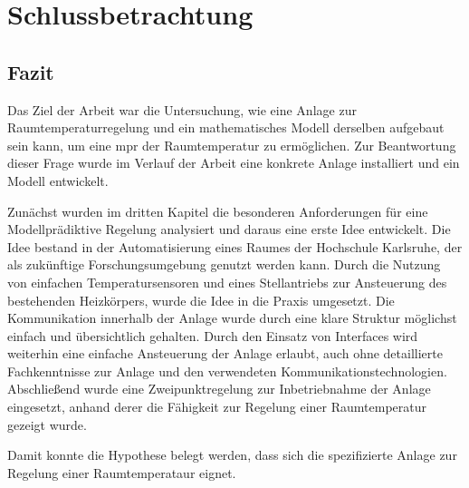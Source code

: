 %
%

\renewcommand{\chapterheadstartvskip}{\vspace*{3cm}}

\chapter{Schlussbetrachtung}
\label{chap:schlussteil}
\renewcommand{\chapterheadstartvskip}{\vspace*{-0.5cm}}

\section{Fazit}
\label{sec:zusammenfassung}

Das Ziel der Arbeit war die Untersuchung, wie eine Anlage zur Raumtemperaturregelung und ein mathematisches Modell derselben aufgebaut sein kann, um eine \acrlong{mpr} der Raumtemperatur zu ermöglichen.
Zur Beantwortung dieser Frage wurde im Verlauf der Arbeit eine konkrete Anlage installiert und ein Modell entwickelt.

Zunächst wurden im dritten Kapitel die besonderen Anforderungen für eine Modellprädiktive Regelung analysiert und daraus eine erste Idee entwickelt. Die Idee bestand in der Automatisierung eines Raumes der Hochschule Karlsruhe, der als zukünftige Forschungsumgebung genutzt werden kann. Durch die Nutzung von einfachen Temperatursensoren und eines Stellantriebs zur Ansteuerung des bestehenden Heizkörpers, wurde die Idee in die Praxis umgesetzt. Die Kommunikation innerhalb der Anlage wurde durch eine klare Struktur möglichst einfach und übersichtlich gehalten. Durch den Einsatz von Interfaces wird weiterhin eine einfache Ansteuerung der Anlage erlaubt, auch ohne detaillierte Fachkenntnisse zur Anlage und den verwendeten Kommunikationstechnologien. Abschließend wurde eine Zweipunktregelung zur Inbetriebnahme der Anlage eingesetzt, anhand derer die Fähigkeit zur Regelung einer Raumtemperatur gezeigt wurde.

Damit konnte die Hypothese belegt werden, dass sich die spezifizierte Anlage zur Regelung einer Raumtemperataur eignet.

